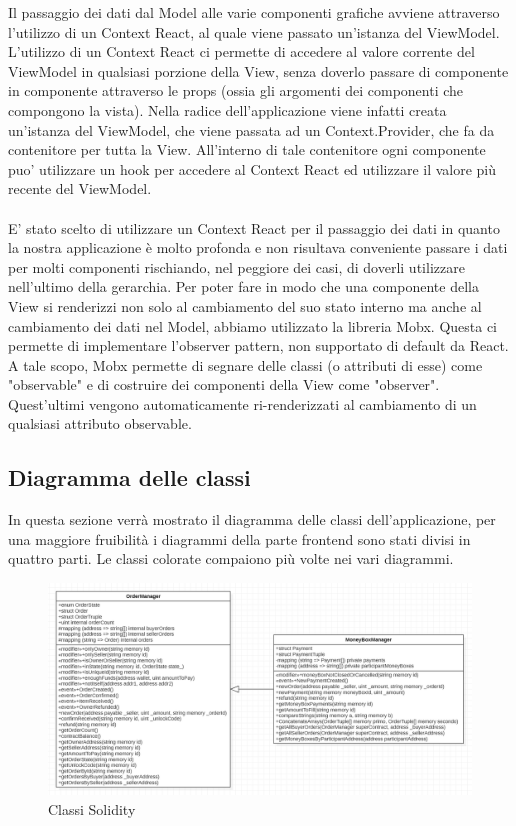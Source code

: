 Il passaggio dei dati dal Model alle varie componenti grafiche avviene attraverso l'utilizzo di un Context
React, al quale viene passato un'istanza del ViewModel. L'utilizzo di un Context React ci permette di
accedere al valore corrente del ViewModel in qualsiasi porzione della View, senza doverlo passare di
componente in componente attraverso le props (ossia gli argomenti dei componenti che compongono la
vista). Nella radice dell'applicazione viene infatti creata un'istanza del ViewModel, che viene passata
ad un Context.Provider, che fa da contenitore per tutta la View. All'interno di tale contenitore ogni
componente puo' utilizzare un hook per accedere al Context React ed utilizzare il valore più recente del ViewModel.
\\
\\
E' stato scelto di utilizzare un Context React per il passaggio dei dati in quanto la nostra applicazione è
molto profonda e non risultava conveniente passare i dati per molti componenti rischiando, nel peggiore
dei casi, di doverli utilizzare nell'ultimo della gerarchia.
Per poter fare in modo che una componente della View si renderizzi non solo al cambiamento del
suo stato interno ma anche al cambiamento dei dati nel Model, abbiamo utilizzato la libreria Mobx.
Questa ci permette di implementare l'observer pattern, non supportato di default da React. A tale
scopo, Mobx permette di segnare delle classi (o attributi di esse) come "observable" e di costruire
dei componenti della View come "observer". Quest'ultimi vengono automaticamente ri-renderizzati al
cambiamento di un qualsiasi attributo observable.

\clearpage
\subsection{Diagramma delle classi}

In questa sezione verrà mostrato il diagramma delle classi dell'applicazione, 
per una maggiore fruibilità i diagrammi della parte frontend sono stati divisi in quattro parti.
Le classi colorate compaiono più volte nei vari diagrammi.

\begin{figure}[H]
    \begin{center}
    \includegraphics[scale=0.5]{immagini/smartcontracts.png}
    \caption{Classi Solidity}
    \end{center}
\end{figure}

